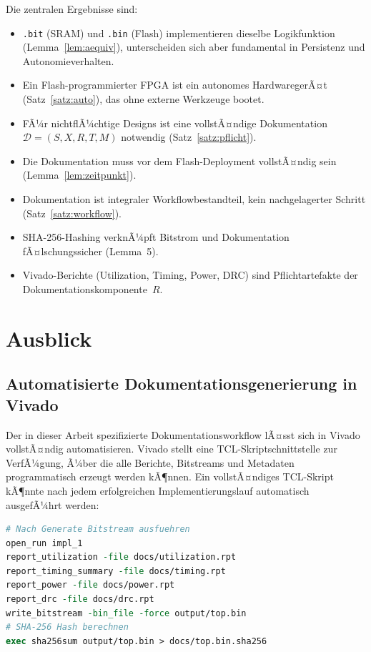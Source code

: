 ﻿\documentclass[a4paper,12pt]{article}
\theoremstyle{definition}
\begin{document}
Die zentralen Ergebnisse sind:
\begin{itemize}
    \item \texttt{.bit} (SRAM) und \texttt{.bin} (Flash) implementieren
          dieselbe Logikfunktion (Lemma~\ref{lem:aequiv}), unterscheiden sich
          aber fundamental in Persistenz und Autonomieverhalten.
    \item Ein Flash-programmierter FPGA ist ein autonomes HardwaregerÃ¤t
          (Satz~\ref{satz:auto}), das ohne externe Werkzeuge bootet.
    \item FÃ¼r nichtflÃ¼chtige Designs ist eine vollstÃ¤ndige Dokumentation
          $\mathcal{D} = (S, X, R, T, M)$ notwendig (Satz~\ref{satz:pflicht}).
    \item Die Dokumentation muss vor dem Flash-Deployment vollstÃ¤ndig sein
          (Lemma~\ref{lem:zeitpunkt}).
    \item Dokumentation ist integraler Workflowbestandteil, kein nachgelagerter
          Schritt (Satz~\ref{satz:workflow}).
    \item SHA-256-Hashing verknÃ¼pft Bitstrom und Dokumentation
          fÃ¤lschungssicher (Lemma~5).
    \item Vivado-Berichte (Utilization, Timing, Power, DRC) sind
          Pflichtartefakte der Dokumentationskomponente~$R$.
\end{itemize}

\section{Ausblick}
\label{sec:ausblick}

\subsection{Automatisierte Dokumentationsgenerierung in Vivado}

Der in dieser Arbeit spezifizierte Dokumentationsworkflow lÃ¤sst sich in Vivado
vollstÃ¤ndig automatisieren. Vivado stellt eine TCL-Skriptschnittstelle zur
VerfÃ¼gung, Ã¼ber die alle Berichte, Bitstreams und Metadaten programmatisch
erzeugt werden kÃ¶nnen. Ein vollstÃ¤ndiges TCL-Skript kÃ¶nnte nach jedem
erfolgreichen Implementierungslauf automatisch ausgefÃ¼hrt werden:

\begin{lstlisting}[language=tcl, caption={Automatisiertes Dokumentations-TCL-Skript}]
# Nach Generate Bitstream ausfuehren
open_run impl_1
report_utilization -file docs/utilization.rpt
report_timing_summary -file docs/timing.rpt
report_power -file docs/power.rpt
report_drc -file docs/drc.rpt
write_bitstream -bin_file -force output/top.bin
# SHA-256 Hash berechnen
exec sha256sum output/top.bin > docs/top.bin.sha256
\end{lstlisting}
\end{document}
